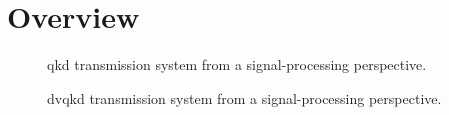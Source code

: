 \section{Overview}



\begin{figure}[htb]
	\centering
	
	\caption{\Gls{qkd} transmission system from a signal-processing perspective.}
\end{figure}

\begin{figure}[htb]
	\centering
	
	\caption{\Gls{dvqkd} transmission system from a signal-processing perspective.}
\end{figure}